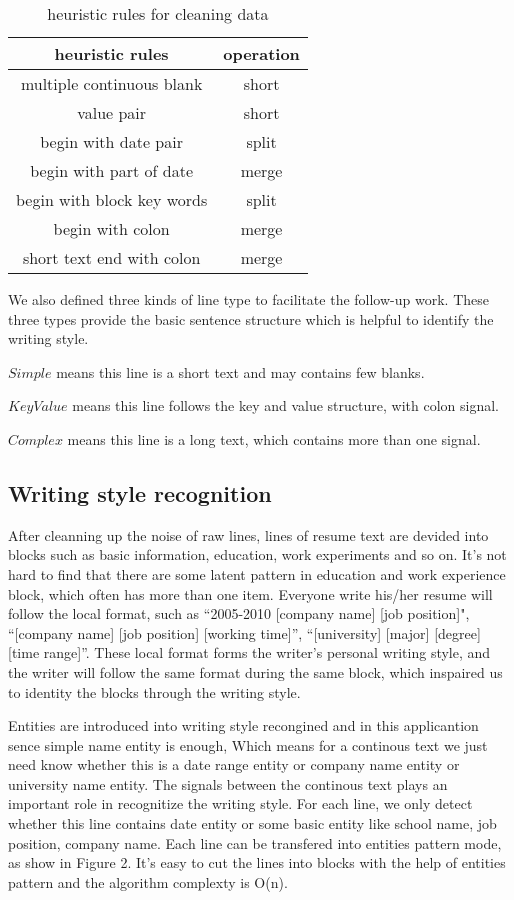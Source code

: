 \documentclass{acm_proc_article-sp}
\begin{document}
\begin{table}
\centering
\caption{heuristic rules for cleaning data}
\begin{tabular}{|c|c|} \hline
heuristic rules & operation\\ \hline
multiple continuous blank & short \\ \hline
value pair & short \\ \hline
begin with date pair & split\\ \hline
begin with part of date & merge \\ \hline
begin with block key words & split \\ \hline
begin with colon & merge\\ \hline
short text end with colon & merge \\
\hline\end{tabular}
\end{table}

We also defined three kinds of line type to facilitate the follow-up work. These three types provide the basic sentence structure which is helpful to identify the writing style.

$Simple$ means this line is a short text and may contains few blanks. 

$KeyValue$ means this line follows the key and value structure, with colon signal.  

$Complex$ means this line is a long text, which contains more than one signal. 

\subsection{Writing style recognition}

After cleanning up the noise of raw lines, lines of resume text are devided into blocks such as basic information, education, work experiments and so on. 
It's not hard to find that there are some latent pattern in education and work experience block, which often has more than one item. 
Everyone write his/her resume will follow the local format, such as ``2005-2010 [company name] [job position]", ``[company name] [job position] [working time]'', ``[university] [major] [degree] [time range]''. 
These local format forms the writer's personal writing style, and the writer will follow the same format during the same block, which inspaired us to identity the blocks through the writing style.

Entities are introduced into writing style recongined and in this applicantion sence simple name entity is enough, Which means for a continous text we just need know whether this is a date range entity or company name entity or university name entity.
The signals between the continous text plays an important role in recognitize the writing style. 
For each line, we only detect whether this line contains date entity or some basic entity like school name, job position, company name.
Each line can be transfered into entities pattern mode, as show in Figure 2. 
It's easy to cut the lines into blocks with the help of entities pattern and the algorithm complexty is O(n).
\end{document}
